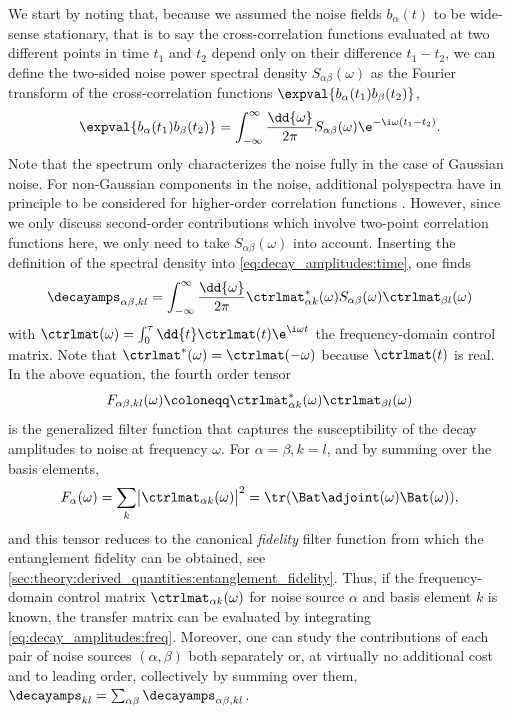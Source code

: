 We start by noting that, because we assumed the noise fields $b_\alpha(t)$ to be wide-sense stationary, that is to say the cross-correlation functions evaluated at two different points in time $t_1$ and $t_2$ depend only on their difference $t_1 - t_2$, we can define the two-sided noise power spectral density $S_{\alpha\beta}(\omega)$ as the Fourier transform of the cross-correlation functions $\expval{b_\alpha(t_1) b_\beta(t_2)}$,
\begin{equation}\label{eq:spectral_density}
    \expval{b_\alpha(t_1) b_{\beta}(t_2)} = \int_{-\infty}^{\infty}\frac{\dd{\omega}}{2\pi} S_{\alpha\beta}(\omega)\e^{-\i\omega (t_1 - t_2)}.
\end{equation}
Note that the spectrum only characterizes the noise fully in the case of Gaussian noise. For non-Gaussian components in the noise, additional polyspectra have in principle to be considered for higher-order correlation functions \cite{Norris2016}. However, since we only discuss second-order contributions which involve two-point correlation functions here, we only need to take $S_{\alpha\beta}(\omega)$ into account. Inserting the definition of the spectral density into \cref{eq:decay_amplitudes:time}, one finds
\begin{equation}\label{eq:decay_amplitudes:freq}
    \decayamps_{\alpha\beta,kl} = \int_{-\infty}^{\infty}\frac{\dd{\omega}}{2\pi}\ctrlmat^\ast_{\alpha k}(\omega)S_{\alpha\beta}(\omega)\ctrlmat_{\beta l}(\omega)
\end{equation}
with $\ctrlmat(\omega) = \int_0^\tau\dd{t}\ctrlmat(t)\e^{\i\omega t}$ the frequency-domain control matrix. Note that $\ctrlmat^\ast(\omega) = \ctrlmat(-\omega)$ because $\ctrlmat(t)$ is real. In the above equation, the fourth order tensor
\begin{equation}\label{eq:filter_function:generalized}
    F_{\alpha\beta,kl}(\omega)\coloneqq\ctrlmat^\ast_{\alpha k}(\omega)\ctrlmat_{\beta l}(\omega)
\end{equation}
is the generalized filter function that captures the susceptibility of the decay amplitudes to noise at frequency $\omega$. For $\alpha = \beta, k = l$, and by summing over the basis elements,
\begin{equation}\label{eq:filter_function:fidelity}
    F_{\alpha}(\omega) = \sum_k\bigl\lvert\ctrlmat_{\alpha k}(\omega)\bigr\rvert^2 = \tr(\Bat\adjoint(\omega)\Bat(\omega)),
\end{equation}
and this tensor reduces to the canonical \emph{fidelity} filter function \cite{Green2012} from which the entanglement fidelity can be obtained, see \cref{sec:theory:derived_quantities:entanglement_fidelity}. Thus, if the frequency-domain control matrix $\ctrlmat_{\alpha k}(\omega)$ for noise source $\alpha$ and basis element $k$ is known, the transfer matrix can be evaluated by integrating \cref{eq:decay_amplitudes:freq}. Moreover, one can study the contributions of each pair of noise sources $(\alpha, \beta)$ both separately or, at virtually no additional cost and to leading order, collectively by summing over them, $\decayamps_{kl} = \sum_{\alpha\beta}\decayamps_{\alpha\beta,kl}$.

